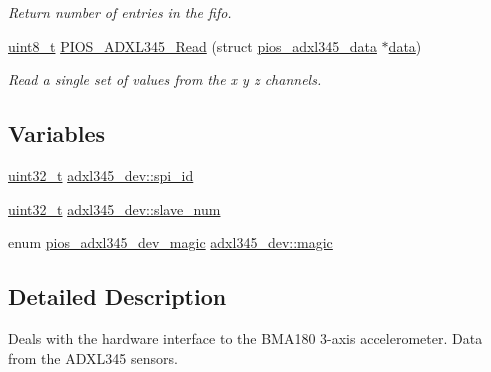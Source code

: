 \begin{DoxyCompactItemize}
\begin{DoxyCompactList}\small\item\em Return number of entries in the fifo. \end{DoxyCompactList}\item 
\hyperlink{stdint_8h_aba7bc1797add20fe3efdf37ced1182c5}{uint8\-\_\-t} \hyperlink{group___p_i_o_s___a_d_x_l345_ga07397b4feb4e0b9dcb4d38f39bd6e432}{P\-I\-O\-S\-\_\-\-A\-D\-X\-L345\-\_\-\-Read} (struct \hyperlink{structpios__adxl345__data}{pios\-\_\-adxl345\-\_\-data} $\ast$\hyperlink{pios__opahrs__proto_8h_a20e3f4bfaeccf09a75ef27e095a10112}{data})
\begin{DoxyCompactList}\small\item\em Read a single set of values from the x y z channels. \end{DoxyCompactList}\end{DoxyCompactItemize}
\subsection*{Variables}
\begin{DoxyCompactItemize}
\item 
\hyperlink{stdint_8h_a435d1572bf3f880d55459d9805097f62}{uint32\-\_\-t} \hyperlink{group___p_i_o_s___a_d_x_l345_ga2681cf2ea08ddf51ce6cea962e6ea9a7}{adxl345\-\_\-dev\-::spi\-\_\-id}
\item 
\hyperlink{stdint_8h_a435d1572bf3f880d55459d9805097f62}{uint32\-\_\-t} \hyperlink{group___p_i_o_s___a_d_x_l345_ga0955d4176a279516aa3b7dcbea03965c}{adxl345\-\_\-dev\-::slave\-\_\-num}
\item 
enum \hyperlink{group___p_i_o_s___a_d_x_l345_ga2f1fd1a4af16c722d816221da8924b5c}{pios\-\_\-adxl345\-\_\-dev\-\_\-magic} \hyperlink{group___p_i_o_s___a_d_x_l345_ga71c28fb64e7d683548f06eb171dc5cde}{adxl345\-\_\-dev\-::magic}
\end{DoxyCompactItemize}


\subsection{Detailed Description}
Deals with the hardware interface to the B\-M\-A180 3-\/axis accelerometer. Data from the A\-D\-X\-L345 sensors.

